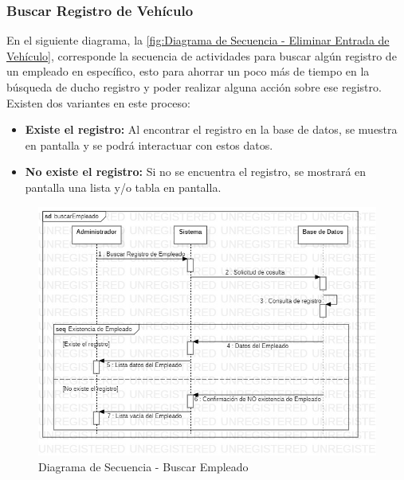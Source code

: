 \subsubsection{Buscar Registro de Vehículo}
En el siguiente diagrama, la \ref{fig:Diagrama de Secuencia - Eliminar Entrada de Vehículo}, corresponde la secuencia de actividades para buscar algún registro de un empleado en específico, esto para ahorrar un poco más de tiempo en la búsqueda de ducho registro y poder realizar alguna acción sobre ese registro. Existen dos variantes en este proceso:
\begin{itemize}
	\item \textbf{Existe el registro:} Al encontrar el registro en la base de datos, se muestra en pantalla y se podrá interactuar con estos datos.
	\item \textbf{No existe el registro:} Si no se encuentra el registro, se mostrará en pantalla una lista y/o tabla en pantalla.
\end{itemize}
\begin{figure}[!h]
	\centering
	\includegraphics[width=1\textwidth]{./diseno/vprocesos/imagenes/buscarEmpleado}
	\caption{Diagrama de Secuencia - Buscar Empleado}
	\label{fig:Diagrama de Secuencia - Buscar Empleado}
\end{figure}
\clearpage